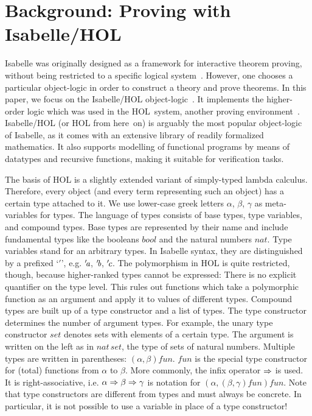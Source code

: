 \section{Background: Proving with Isabelle/HOL}\label{subsec:isabelle}

Isabelle was originally designed as a framework for interactive theorem
proving, without being restricted to a specific logical system~\cite{paulson90}.
However, one chooses a particular object-logic in order to construct a theory
and prove theorems.
In this paper, we focus on the Isabelle/HOL object-logic~\cite{npw02}.
It implements the higher-order logic which was used in the HOL~system,
another proving environment~\cite{gordon93}.
Isabelle/HOL (or HOL from here~on) is arguably the most popular object-logic
of Isabelle, as it comes with an extensive library of readily formalized
mathematics.
It also supports modelling of functional programs by means of datatypes and
recursive functions, making it suitable for verification tasks. %

The basis of HOL is a slightly extended variant of simply-typed lambda calculus.
Therefore, every object (and every term representing such an object) has a
certain type attached to it.
We use lower-case greek letters $\alpha$, $\beta$, $\gamma$ as meta-variables
for types.
The language of types consists of base types, type variables, and compound
types.
Base types are represented by their name and include fundamental types like
the booleans $\mathit{bool}$ and the natural numbers $\mathit{nat}$.
Type variables stand for an arbitrary types.
In Isabelle syntax, they are distinguished by a prefixed `$'$', e.g.
${'\!\textit{a}}$, ${'\!\textit{b}}$, ${'\!\textit{c}}$.
The polymorphism in HOL is quite restricted, though, because higher-ranked
types cannot be expressed:
There is no explicit quantifier on the type level.
This rules out functions which take a polymorphic function as an argument and
apply it to values of different types.
Compound types are built up of a type constructor and a list of types.
The type constructor determines the number of argument types.
For example, the unary type constructor $\mathit{set}$ denotes sets with
elements of a certain type.
The argument is written on the left as in $\mathit{nat\,set}$, the type of
sets of natural numbers.
Multiple types are written in parentheses: $(\alpha, \beta) \mathit{fun}$.
$\mathit{fun}$ is the special type constructor for (total) functions from
$\alpha$ to $\beta$.
More commonly, the infix operator $\Rightarrow$ is used.
It is right-associative, i.e. $\alpha \Rightarrow \beta \Rightarrow \gamma$ is notation for
$(\alpha, (\beta, \gamma) \mathit{fun}) \mathit{fun}$.
Note that type constructors are different from types and must always be
concrete.
In particular, it is not possible to use a variable in place of a type
constructor!

